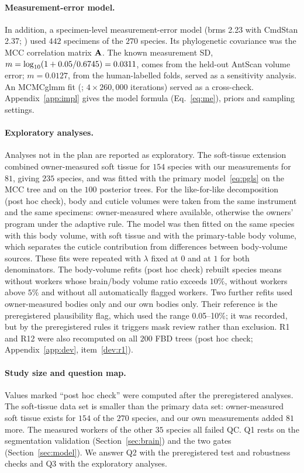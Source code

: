 \documentclass[11pt]{article}
\begin{document}
\paragraph{Measurement-error model.} In addition, a specimen-level measurement-error model (brms 2.23 with CmdStan
2.37; \citealp{burkner2017,carpenter2017}) used $442$ specimens of the $270$ species. Its phylogenetic covariance was
the MCC correlation matrix $\mathbf{A}$. The known measurement SD, $m = \log_{10}(1 + 0.05/0.6745) = 0.0311$, comes from the
held-out AntScan volume error; $m = 0.0127$, from the human-labelled folds, served as a sensitivity analysis. An
MCMCglmm fit (\citealp{hadfield2010}; $4 \times 260{,}000$ iterations) served as a cross-check.
Appendix~\ref{app:impl} gives the model formula (Eq.~\eqref{eq:me}), priors and sampling settings.

\paragraph{Exploratory analyses.} Analyses not in the plan are reported as exploratory. The soft-tissue extension
combined owner-measured soft tissue for $154$ species with our measurements for $81$, giving $235$ species, and was
fitted with the primary model~\eqref{eq:pgls} on the MCC tree and on the $100$ posterior trees. For the like-for-like
decomposition (post hoc check), body and cuticle volumes were taken from the same instrument and the same specimens:
owner-measured where available, otherwise the owners' program under the adaptive rule. The model was then fitted on
the same species with this body volume, with soft tissue and with the primary-table body volume, which separates the
cuticle contribution from differences between body-volume sources. These fits were repeated with $\lambda$ fixed at
$0$ and at $1$ for both denominators. The body-volume refits (post hoc check) rebuilt species means without workers whose
brain/body volume ratio exceeds $10\%$, without workers above $5\%$ and without all automatically flagged workers. Two
further refits used owner-measured bodies only and our own bodies only. Their reference is the preregistered
plausibility flag, which used the range 0.05--10\%; it was recorded, but by the preregistered rules it triggers mask
review rather than exclusion. R1 and R12 were also recomputed on all $200$ FBD trees (post hoc check;
Appendix~\ref{app:dev}, item~\ref{dev:r1}).

\paragraph{Study size and question map.} Values marked ``post hoc check'' were computed after the preregistered
analyses. The soft-tissue data set is smaller than the primary data set: owner-measured
soft tissue exists for $154$ of the $270$ species, and our own measurements added $81$ more. The measured workers of
the other $35$ species all failed QC. Q1 rests on the segmentation validation (Section~\ref{sec:brain}) and the two
gates (Section~\ref{sec:model}). We answer Q2 with the preregistered test and robustness checks and Q3 with the
exploratory analyses.
\end{document}
